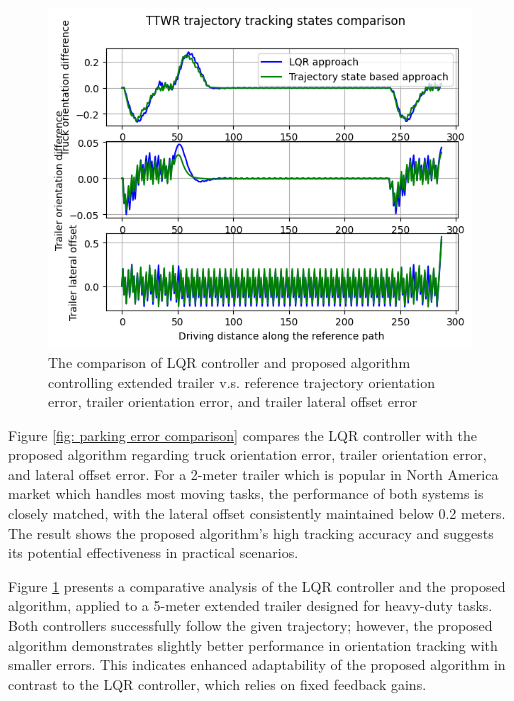 \begin{figure}[htbp]
    \centerline{\includegraphics[width=0.8\linewidth]{fig/knownMBRL/comparison of lqr ppo extended vehicle.png}}
    \caption{The comparison of LQR controller and proposed algorithm controlling extended trailer v.s. reference trajectory orientation error, trailer orientation error, and trailer lateral offset error}
    \label{fig: parking error comparison of extended trailer}
\end{figure}

Figure \ref{fig: parking error comparison} compares the LQR controller with the proposed algorithm regarding truck orientation error, trailer orientation error, and lateral offset error. For a 2-meter trailer which is popular in North America market which handles most moving tasks, the performance of both systems is closely matched, with the lateral offset consistently maintained below 0.2 meters. The result shows the proposed algorithm's high tracking accuracy and suggests its potential effectiveness in practical scenarios.

Figure \ref{fig: parking error comparison of extended trailer} presents a comparative analysis of the LQR controller and the proposed algorithm, applied to a 5-meter extended trailer designed for heavy-duty tasks. Both controllers successfully follow the given trajectory; however, the proposed algorithm demonstrates slightly better performance in orientation tracking with smaller errors. This indicates enhanced adaptability of the proposed algorithm in contrast to the LQR controller, which relies on fixed feedback gains.